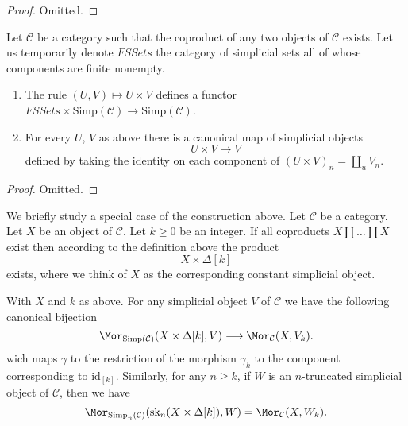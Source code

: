 \begin{proof}
Omitted.
\end{proof}

\begin{lemma}
\label{lemma-back-to-U}
Let $\mathcal{C}$ be a category such that the coproduct of
any two objects of $\mathcal{C}$ exists. Let us temporarily
denote $\textit{FSSets}$ the category of simplicial sets
all of whose components are finite nonempty.
\begin{enumerate}
\item The rule $(U, V) \mapsto U \times V$
defines a functor
$\textit{FSSets} \times \text{Simp}(\mathcal{C})
\to \text{Simp}(\mathcal{C})$.
\item For every $U$, $V$ as above
there is a canonical map of simplicial objects
$$
U \times V \longrightarrow V
$$
defined by taking the identity on each component of
$(U \times V)_n = \coprod_u V_n$.
\end{enumerate}
\end{lemma}

\begin{proof}
Omitted.
\end{proof}

\noindent
We briefly study a special case of the construction
above. Let $\mathcal{C}$ be a category.
Let $X$ be an object of $\mathcal{C}$.
Let $k \geq 0$ be an integer.
If all coproducts $X \coprod \ldots \coprod X$ exist
then according to the definition above the product
$$
X \times \Delta[k]
$$
exists, where we think of $X$ as the corresponding constant
simplicial object.

\begin{lemma}
\label{lemma-morphism-from-coproduct}
With $X$ and $k$ as above.
For any simplicial object $V$ of
$\mathcal{C}$ we have the following
canonical bijection
$$
\Mor_{\text{Simp}(\mathcal{C})}(X \times \Delta[k], V)
\longrightarrow
\Mor_\mathcal{C}(X, V_k).
$$
wich maps $\gamma$ to the restriction of the
morphism $\gamma_k$ to the component corresponding
to $\text{id}_{[k]}$.
Similarly, for any $n \geq k$, if $W$ is an
$n$-truncated simplicial object
of $\mathcal{C}$, then we have
$$
\Mor_{\text{Simp}_n(\mathcal{C})}(\text{sk}_n(X \times \Delta[k]), W)
=
\Mor_\mathcal{C}(X, W_k).
$$
\end{lemma}

